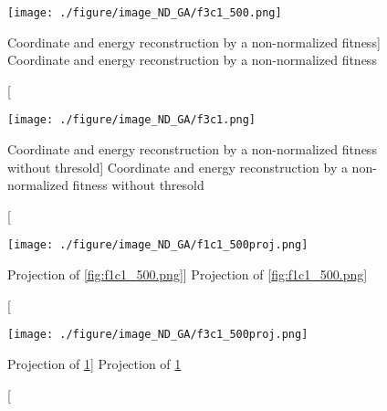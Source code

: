 \begin{figure}
    \centering
    \texttt{[image: ./figure/image\_ND\_GA/f3c1\_500.png]}
    \caption
    [Coordinate and energy reconstruction by a non-normalized fitness]
    {Coordinate and energy reconstruction by a non-normalized fitness}
    \label{fig:f3c1_500.png}
    \end{figure}



\begin{figure}
    \centering
    \texttt{[image: ./figure/image\_ND\_GA/f3c1.png]}
    \caption
    [Coordinate and energy reconstruction by a non-normalized fitness without thresold]
    {Coordinate and energy reconstruction by a non-normalized fitness without thresold}
    \label{fig:f3c1.png}
    \end{figure}






\begin{figure}
    \centering
    \texttt{[image: ./figure/image\_ND\_GA/f1c1\_500proj.png]}
    \caption
    [Projection of \ref{fig:f1c1_500.png}]
    {Projection of \ref{fig:f1c1_500.png}}
    \label{fig:f1c1_500proj.png}
    \end{figure}




\begin{figure}
    \centering
    \texttt{[image: ./figure/image\_ND\_GA/f3c1\_500proj.png]}
    \caption
    [Projection of \ref{fig:f3c1_500.png}]
    {Projection of \ref{fig:f3c1_500.png}}
    \label{fig:f3c1_500proj.png}
    \end{figure}
















